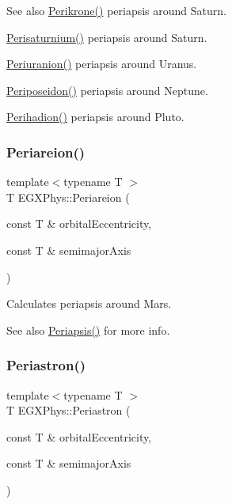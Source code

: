\begin{DoxySeeAlso}{See also}
\mbox{\hyperlink{group___periapsis_gaa56f74c44a3583b8f0d13b821c1d7422}{Perikrone()}} periapsis around Saturn. 

\mbox{\hyperlink{group___periapsis_ga60a50d09d29ebe47cbbfc125c2ea42bf}{Perisaturnium()}} periapsis around Saturn. 

\mbox{\hyperlink{group___periapsis_gab8b8131a617dd2d2a4de1d48accd7442}{Periuranion()}} periapsis around Uranus. 

\mbox{\hyperlink{group___periapsis_ga237e7af3794202c67e65f64f4c8abc2a}{Periposeidon()}} periapsis around Neptune. 

\mbox{\hyperlink{group___periapsis_gafb16e46e55078b38604eef0d7c7c40c4}{Perihadion()}} periapsis around Pluto. 
\end{DoxySeeAlso}
\mbox{\label{group___periapsis_ga0617ba07a30b0fd0544c02f691bfae26}} 
\subsubsection{\texorpdfstring{Periareion()}{Periareion()}}
{\footnotesize\ttfamily template$<$typename T $>$ \\
T E\+G\+X\+Phys\+::\+Periareion (\begin{DoxyParamCaption}\item[{const T \&}]{orbital\+Eccentricity,  }\item[{const T \&}]{semimajor\+Axis }\end{DoxyParamCaption})}



Calculates periapsis around Mars. 

\begin{DoxySeeAlso}{See also}
\mbox{\hyperlink{group___periapsis_ga4414ac75539371ec874a3d25cad6c9fe}{Periapsis()}} for more info. 
\end{DoxySeeAlso}
\mbox{\label{group___periapsis_ga477de6824cbb5986cdae923141e21648}} 
\subsubsection{\texorpdfstring{Periastron()}{Periastron()}}
{\footnotesize\ttfamily template$<$typename T $>$ \\
T E\+G\+X\+Phys\+::\+Periastron (\begin{DoxyParamCaption}\item[{const T \&}]{orbital\+Eccentricity,  }\item[{const T \&}]{semimajor\+Axis }\end{DoxyParamCaption})}



